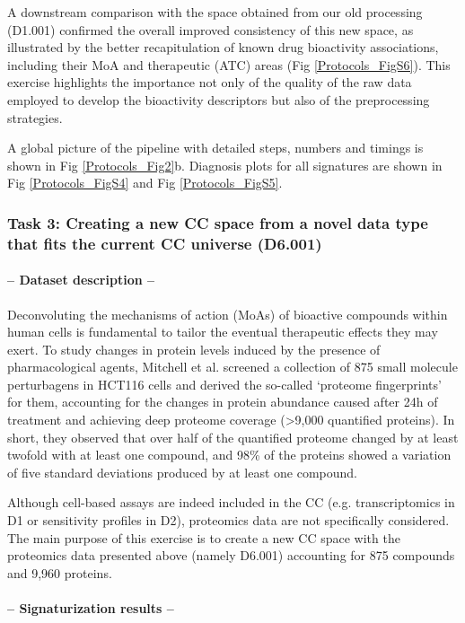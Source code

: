 A downstream comparison with the space obtained from our old processing (D1.001) confirmed the overall improved consistency of this new space, as illustrated by the better recapitulation of known drug bioactivity associations, including their MoA and therapeutic (ATC) areas (Fig \ref{Protocols_FigS6}). This exercise highlights the importance not only of the quality of the raw data employed to develop the bioactivity descriptors but also of the preprocessing strategies.

A global picture of the pipeline with detailed steps, numbers and timings is shown in Fig \ref{Protocols_Fig2}b. Diagnosis plots for all signatures are shown in Fig \ref{Protocols_FigS4} and Fig \ref{Protocols_FigS5}.


\subsubsection{Task 3: Creating a new CC space from a novel data type that fits the current CC universe (D6.001)}

\paragraph{-- Dataset description --} \leavevmode

Deconvoluting the mechanisms of action (MoAs) of bioactive compounds within human cells is fundamental to tailor the eventual therapeutic effects they may exert. To study changes in protein levels induced by the presence of pharmacological agents, Mitchell et al.\cite{mitchell_proteome-wide_2023} screened a collection of 875 small molecule perturbagens in HCT116 cells and derived the so-called ‘proteome fingerprints’ for them, accounting for the changes in protein abundance caused after 24h of treatment and achieving deep proteome coverage (>9,000 quantified proteins). In short, they observed that over half of the quantified proteome changed by at least twofold with at least one compound, and 98\% of the proteins showed a variation of five standard deviations produced by at least one compound. 

Although cell-based assays are indeed included in the CC (e.g. transcriptomics in D1 or sensitivity profiles in D2), proteomics data are not specifically considered. The main purpose of this exercise is to create a new CC space with the proteomics data presented above (namely D6.001) accounting for 875 compounds and 9,960 proteins.  

\paragraph{-- Signaturization results --}  \leavevmode

